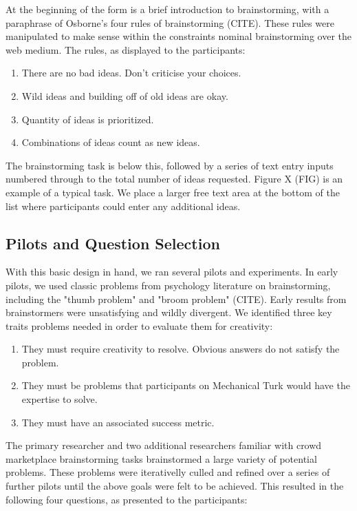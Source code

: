 At the beginning of the form is a brief introduction to brainstorming, with a paraphrase of Osborne's four rules of brainstorming (CITE). These rules were manipulated to make sense within the constraints nominal brainstorming over the web medium. The rules, as displayed to the participants:

\begin{enumerate}
\item There are no bad ideas. Don't criticise your choices.
\item Wild ideas and building off of old ideas are okay.
\item Quantity of ideas is prioritized.
\item Combinations of ideas count as new ideas.
\end{enumerate}

The brainstorming task is below this, followed by a series of text entry inputs numbered through to the total number of ideas requested. Figure X (FIG) is an example of a typical task. We place a larger free text area at the bottom of the list where participants could enter any additional ideas.

\subsection{Pilots and Question Selection}

With this basic design in hand, we ran several pilots and experiments. In early pilots, we used classic problems from psychology literature on brainstorming, including the "thumb problem" and "broom problem" (CITE). Early results from brainstormers were unsatisfying and wildly divergent. We identified three key traits problems needed in order to evaluate them for creativity:

\begin{enumerate}
\item They must require creativity to resolve. Obvious answers do not satisfy the problem.
\item They must be problems that participants on Mechanical Turk would have the expertise to solve.
\item They must have an associated success metric.
\end{enumerate}

The primary researcher and two additional researchers familiar with crowd marketplace brainstorming tasks brainstormed a large variety of potential problems. These problems were iterativelly culled and refined over a series of further pilots until the above goals were felt to be achieved. This resulted in the following four questions, as presented to the participants:

